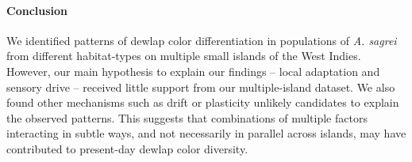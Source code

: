\paragraph{Conclusion} We identified patterns of dewlap color differentiation in populations of \textit{A. sagrei} from different habitat-types on multiple small islands of the West Indies. However, our main hypothesis to explain our findings -- local adaptation and sensory drive -- received little support from our multiple-island dataset. We also found other mechanisms such as drift or plasticity unlikely candidates to explain the observed patterns. This suggests that combinations of multiple factors interacting in subtle ways, and not necessarily in parallel across islands, may have contributed to present-day dewlap color diversity. 
